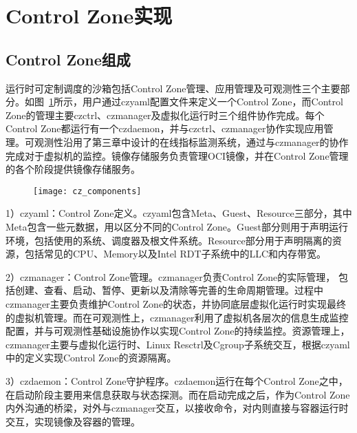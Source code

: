 \section{Control Zone实现}

\subsection{Control Zone组成}


运行时可定制调度的沙箱包括Control Zone管理、应用管理及可观测性三个主要部分。如图~\ref{fig:cz_components}所示，用户通过czyaml配置文件来定义一个Control Zone，而Control Zone的管理主要czctrl、czmanager及虚拟化运行时三个组件协作完成。每个Control Zone都运行有一个czdaemon，并与czctrl、czmanager协作实现应用管理。可观测性沿用了第三章中设计的在线指标监测系统，通过与czmanager的协作完成对于虚拟机的监控。镜像存储服务负责管理OCI镜像，并在Control Zone管理的各个阶段提供镜像存储服务。

\begin{figure}[!htbp]
    \centering
    \texttt{[image: cz\_components]}
    \label{fig:cz_components}
\end{figure}

1）czyaml：Control Zone定义。czyaml包含Meta、Guest、Resource三部分，其中Meta包含一些元数据，用以区分不同的Control Zone。Guest部分则用于声明运行环境，包括使用的系统、调度器及根文件系统。Resource部分用于声明隔离的资源，包括常见的CPU、Memory以及Intel RDT子系统中的LLC和内存带宽。

2）czmanager：Control Zone管理。czmanager负责Control Zone的实际管理， 包括创建、查看、启动、暂停、更新以及清除等完善的生命周期管理。过程中czmanager主要负责维护Control Zone的状态，并协同底层虚拟化运行时实现最终的虚拟机管理。而在可观测性上，czmanager利用了虚拟机各层次的信息生成监控配置，并与可观测性基础设施协作以实现Control Zone的持续监控。资源管理上，czmanager主要与虚拟化运行时、Linux Resctrl及Cgroup子系统交互，根据czyaml中的定义实现Control Zone的资源隔离。

3）czdaemon：Control Zone守护程序。czdaemon运行在每个Control Zone之中，在启动阶段主要用来信息获取与状态探测。而在启动完成之后，作为Control Zone内外沟通的桥梁，对外与czmanager交互，以接收命令，对内则直接与容器运行时交互，实现镜像及容器的管理。

